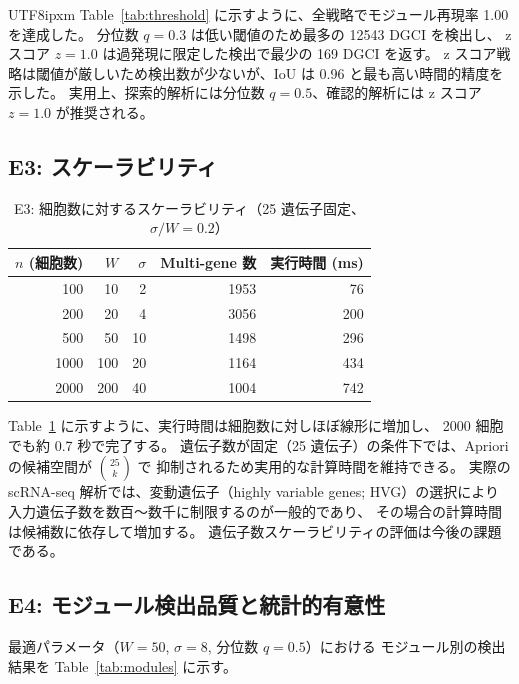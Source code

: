 \documentclass[11pt,a4paper]{article}
\begin{document}
\begin{CJK}{UTF8}{ipxm}
Table~\ref{tab:threshold} に示すように、全戦略でモジュール再現率 1.00 を達成した。
分位数 $q=0.3$ は低い閾値のため最多の 12543 DGCI を検出し、
z スコア $z=1.0$ は過発現に限定した検出で最少の 169 DGCI を返す。
z スコア戦略は閾値が厳しいため検出数が少ないが、IoU は 0.96 と最も高い時間的精度を示した。
実用上、探索的解析には分位数 $q=0.5$、確認的解析には z スコア $z=1.0$ が推奨される。

\subsection{E3: スケーラビリティ}

\begin{table}[t]
\centering
\caption{E3: 細胞数に対するスケーラビリティ（25 遺伝子固定、$\sigma/W = 0.2$）}
\label{tab:scalability}
\begin{tabular}{r|rr|rr}
\toprule
$n$ (細胞数) & $W$ & $\sigma$ & Multi-gene 数 & 実行時間 (ms) \\
\midrule
 100  &  10 &   2 &  1953 &    76 \\
 200  &  20 &   4 &  3056 &   200 \\
 500  &  50 &  10 &  1498 &   296 \\
1000  & 100 &  20 &  1164 &   434 \\
2000  & 200 &  40 &  1004 &   742 \\
\bottomrule
\end{tabular}
\end{table}

Table~\ref{tab:scalability} に示すように、実行時間は細胞数に対しほぼ線形に増加し、
2000 細胞でも約 0.7 秒で完了する。
遺伝子数が固定（25 遺伝子）の条件下では、Apriori の候補空間が $\binom{25}{k}$ で
抑制されるため実用的な計算時間を維持できる。
実際の scRNA-seq 解析では、変動遺伝子（highly variable genes; HVG）の選択により
入力遺伝子数を数百〜数千に制限するのが一般的であり、
その場合の計算時間は候補数に依存して増加する。
遺伝子数スケーラビリティの評価は今後の課題である。

\subsection{E4: モジュール検出品質と統計的有意性}

最適パラメータ（$W=50$, $\sigma=8$, 分位数 $q=0.5$）における
モジュール別の検出結果を Table~\ref{tab:modules} に示す。


\end{CJK}
\end{document}
